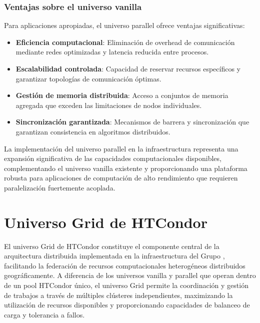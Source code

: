 \subsubsection{Ventajas sobre el universo vanilla}
\noindent

Para aplicaciones apropiadas, el universo parallel ofrece ventajas significativas:

\begin{itemize}
	\item \textbf{Eficiencia computacional}: Eliminación de overhead de comunicación mediante redes optimizadas y latencia reducida entre procesos.
	
	\item \textbf{Escalabilidad controlada}: Capacidad de reservar recursos específicos y garantizar topologías de comunicación óptimas.
	
	\item \textbf{Gestión de memoria distribuida}: Acceso a conjuntos de memoria agregada que exceden las limitaciones de nodos individuales.
	
	\item \textbf{Sincronización garantizada}: Mecanismos de barrera y sincronización que garantizan consistencia en algoritmos distribuidos.
\end{itemize}

La implementación del universo parallel en la infraestructura \GRID representa una expansión significativa de las capacidades computacionales disponibles, complementando el universo vanilla existente y proporcionando una plataforma robusta para aplicaciones de computación de alto rendimiento que requieren paralelización fuertemente acoplada.

\section{Universo Grid de HTCondor}
\noindent

El universo Grid de HTCondor constituye el componente central de la arquitectura distribuida implementada en la infraestructura del Grupo \GRID, facilitando la federación de recursos computacionales heterogéneos distribuidos geográficamente. A diferencia de los universos vanilla y parallel que operan dentro de un pool HTCondor único, el universo Grid permite la coordinación y gestión de trabajos a través de múltiples clústeres independientes, maximizando la utilización de recursos disponibles y proporcionando capacidades de balanceo de carga y tolerancia a fallos.

